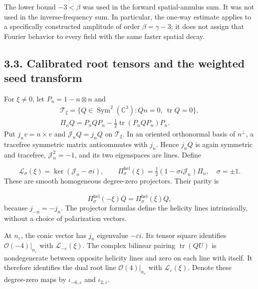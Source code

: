 \documentclass[
  english,
  11pt,
  reqno]{amsart}
\begin{document}
The lower bound \(-3<\beta\) was used in the forward spatial-annulus
sum. It was not used in the inverse-frequency sum. In particular, the
one-way estimate applies to a specifically constructed amplitude of
order \(\beta=\gamma-3\); it does not assign that Fourier behavior to
every field with the same faster spatial decay.

\subsection{3.3. Calibrated root tensors and the weighted seed
transform}\label{calibrated-root-tensors-and-the-weighted-seed-transform}\label{sec:online-root-calibration-and-seeds}

For \(\xi\ne0\), let \(P_n=1-n\otimes n\) and \[
\begin{gathered}
\mathcal T_\xi=
\{Q\in\operatorname{Sym}^2(\mathbb C^3):Qn=0,\ \operatorname{tr}Q=0\}, \\
\Pi_nQ=P_nQP_n-\tfrac12\operatorname{tr}(P_nQP_n)P_n.
\end{gathered}
\] Put \(j_n v=n\times v\) and \(\mathcal J_nQ=j_nQ\) on
\(\mathcal T_\xi\). In an oriented orthonormal basis of \(n^\perp\), a
tracefree symmetric matrix anticommutes with \(j_n\). Hence \(j_nQ\) is
again symmetric and tracefree, \(\mathcal J_n^2=-1\), and its two
eigenspaces are lines. Define

\label{eq:online-root-helicity-projectors} \[
\mathcal L_\sigma(\xi)=\ker(\mathcal J_n-\sigma i),
\qquad
\Pi^{\mathrm{hel}}_\sigma(\xi)
=\tfrac12(1-\sigma i\mathcal J_n)\Pi_n,
\quad \sigma=\pm1.
\] These are smooth homogeneous degree-zero projectors. Their parity is

\label{eq:online-root-helicity-parity} \[
\Pi^{\mathrm{hel}}_\sigma(-\xi)\overline Q
=\overline{\Pi^{\mathrm{hel}}_\sigma(\xi)Q},
\] because \(j_{-n}=-j_n\). The projector formulas define the helicity
lines intrinsically, without a choice of polarization vectors.

At \(n_\varepsilon\), the conic vector has \(j_n\) eigenvalue
\(-\varepsilon i\). Its tensor square identifies
\(\mathcal O(-4)|_{n_\varepsilon}\) with
\(\mathcal L_{-\varepsilon}(\xi)\). The complex bilinear pairing
\(\operatorname{tr}(QU)\) is nondegenerate between opposite helicity
lines and zero on each line with itself. It therefore identifies the
dual root line \(\mathcal O(4)|_{n_\varepsilon}\) with
\(\mathcal L_\varepsilon(\xi)\). Denote these degree-zero maps by
\(\iota_{-6,\varepsilon}\) and \(\iota_{2,\varepsilon}\).
\end{document}
